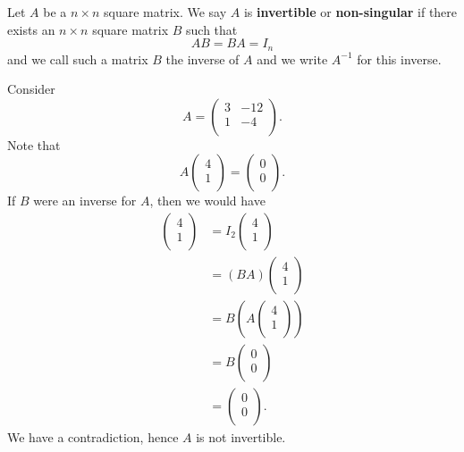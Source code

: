 \begin{definition}
    Let $A$ be a $n\times n$ square matrix. We say $A$ is \textbf{invertible} or \textbf{non-singular} if there exists an $n\times n$ square matrix $B$ such that \[AB=BA=I_n\] and we call such a matrix $B$ the inverse of $A$ and we write $A^{-1}$ for this inverse.
\end{definition}

\begin{example}
    Consider
    \[
        A=
        \begin{pmatrix}
            3&-12\\1&-4\\
        \end{pmatrix}
        .
    \]
    Note that 
    \[
        A
        \begin{pmatrix}
            4\\1\\
        \end{pmatrix}
        =
        \begin{pmatrix}
            0\\0\\
        \end{pmatrix}
        .
    \]
    If $B$ were an inverse for $A$, then we would have
    \begin{align*}
        \begin{pmatrix}
            4\\1\\
        \end{pmatrix}
        &=I_2
        \begin{pmatrix}
            4\\1\\
        \end{pmatrix}
        \\
        &=(BA)
        \begin{pmatrix}
            4\\1\\
        \end{pmatrix}
        \\
        &=B\left(A
        \begin{pmatrix}
            4\\1\\
        \end{pmatrix}
        \right)
        \\
        &=B
        \begin{pmatrix}
            0\\0\\
        \end{pmatrix}
        \\
        &=
        \begin{pmatrix}
            0\\0\\
        \end{pmatrix}
        .
    \end{align*}
    We have a contradiction, hence $A$ is not invertible.
\end{example}

